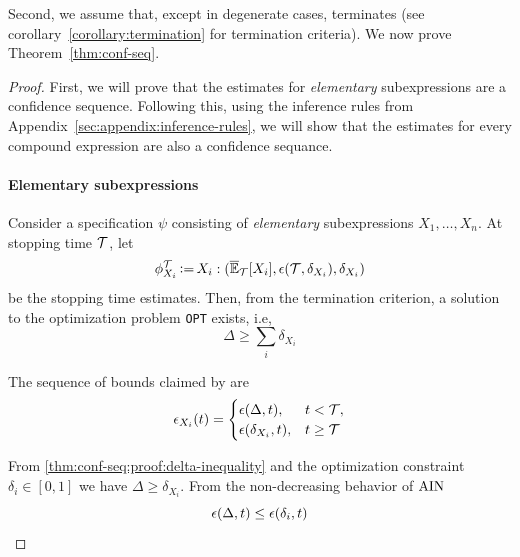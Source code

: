 Second, we assume that, except in degenerate cases, \AVOIRmethodname{} terminates (see corollary~\ref{corollary:termination} for termination criteria). 
We now prove Theorem~\ref{thm:conf-seq}.
\begin{proof}
First, we will prove that the estimates for \textit{elementary} subexpressions are a confidence sequence.
Following this, using the inference rules from Appendix~\ref{sec:appendix:inference-rules}, we will show that the estimates for every compound expression are also a confidence sequance.
\paragraph{Elementary subexpressions} Consider a specification $\psi$ consisting of \textit{elementary} subexpressions $X_1, \dots, X_n$.
At stopping time ${\mathcal{T}}$, let
\begin{equation}
    \phi^{\mathcal{T}}_{X_i} \operatorname{\vcentcolon=} X_i: (\overline{\mathbb{E}}_{\mathcal{T}}[X_i], \epsilon({\mathcal{T}}, \delta_{X_i}), \delta_{X_i})
    \label{eqn:conf-seq:elementary:stopping}
\end{equation}
be the stopping time estimates. 
Then, from the termination criterion, a solution to the optimization problem \texttt{OPT} exists, i.e, 
\begin{equation}
    \Delta  \geq \sum_i \delta_{X_i}
    \label{thm:conf-seq:proof:delta-inequality}
\end{equation}

The sequence of bounds claimed by \AVOIRmethodname{} are
\begin{align}
    \epsilon_{X_i}(t) = 
    \begin{cases}
        \epsilon(\Delta, t), & t < {\mathcal{T}}, \\
        \epsilon(\delta_{X_i}, t), & t \geq {\mathcal{T}}
    \end{cases}
    \label{eqn:conf-seq:epsilon:def}
\end{align}

From \eqref{thm:conf-seq:proof:delta-inequality} and the optimization constraint $\delta_i \in [0, 1]$ we have $\Delta \geq \delta_{X_i}$. 
From the non-decreasing behavior of $\rm{AIN}$
\begin{equation}
    {\epsilon}(\Delta, t) \leq {\epsilon}(\delta_i, t)
    \label{eqn:conf-seq:lemma-derivation}
\end{equation}


\end{proof}
